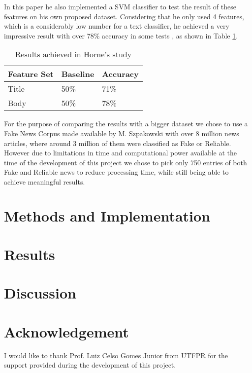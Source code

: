 \documentclass[conference]{IEEEtran}
\begin{document}
In this paper he also implemented a SVM classifier to test the result of these features on his own
proposed dataset. Considering that he only used 4 features, which is a considerably low number for
a text classifier, he achieved a very impressive result with over 78\% accuracy in some tests , as
shown in Table \ref{table:horne_results}.

\begin{table}[htbp]
\caption{Results achieved in Horne's study}
\begin{center}
\begin{tabular}{ |l|l|l| }
\hline
Feature Set & Baseline & Accuracy \\
\hline
Title & 50\% & 71\% \\
Body & 50\% & 78\% \\
\hline
\end{tabular}
\label{table:horne_results}
\end{center}
\end{table}

For the purpose of comparing the results with a bigger dataset we chose to use a Fake News Corpus
made available by M. Szpakowski \cite{szpakowski_2019} with over 8 million news articles, where around
3 million of them were classified as Fake or Reliable. However due to limitations in time and 
computational power available at the time of the development of this project we chose to pick
only 750 entries of both Fake and Reliable news to reduce processing time, while still being able
to achieve meaningful results.

\section{Methods and Implementation}

\section{Results}

\section{Discussion}

\section*{Acknowledgement}
I would like to thank Prof. Luiz Celso Gomes Junior from UTFPR for the support
provided during the development of this project.


 
\end{document}
